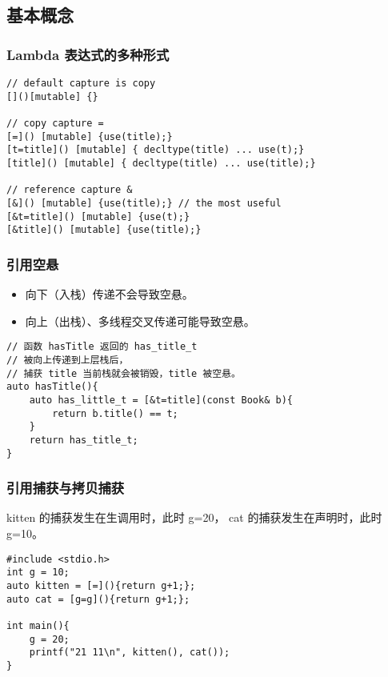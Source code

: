 \documentclass{article}
\begin{document}
\subsection{基本概念}

\subsubsection{Lambda 表达式的多种形式}
\begin{verbatim}
// default capture is copy 
[]()[mutable] {}

// copy capture = 
[=]() [mutable] {use(title);}
[t=title]() [mutable] { decltype(title) ... use(t);}
[title]() [mutable] { decltype(title) ... use(title);}

// reference capture &
[&]() [mutable] {use(title);} // the most useful
[&t=title]() [mutable] {use(t);}
[&title]() [mutable] {use(title);}
\end{verbatim}

\subsubsection{引用空悬}
    \begin{itemize}
        \item 向下（入栈）传递不会导致空悬。
        \item 向上（出栈）、多线程交叉传递可能导致空悬。
    \end{itemize}

\begin{verbatim}
// 函数 hasTitle 返回的 has_title_t 
// 被向上传递到上层栈后，
// 捕获 title 当前栈就会被销毁，title 被空悬。
auto hasTitle(){
    auto has_little_t = [&t=title](const Book& b){
        return b.title() == t;
    }
    return has_title_t;    
}
\end{verbatim}

\subsubsection{引用捕获与拷贝捕获}
kitten 的捕获发生在生调用时，此时 g=20，
cat 的捕获发生在声明时，此时 g=10。

\begin{verbatim}
#include <stdio.h>
int g = 10;
auto kitten = [=](){return g+1;};
auto cat = [g=g](){return g+1;};

int main(){
    g = 20;
    printf("21 11\n", kitten(), cat());
}
\end{verbatim}
\end{document}
